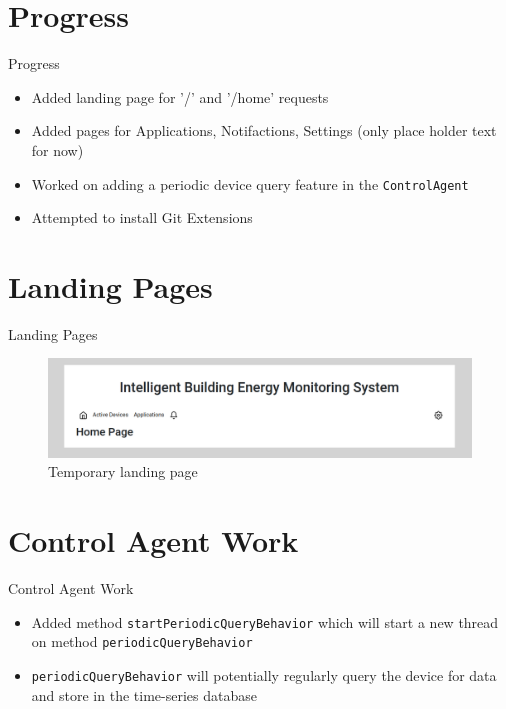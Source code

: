 \documentclass{beamer}
\begin{document}
\section{Progress}
\begin{frame}{Progress}{}
	\begin{itemize}
		\item Added landing page for '/' and '/home' requests
		\item Added pages for Applications, Notifactions, Settings (only place holder text for now)
		\item Worked on adding a periodic device query feature in the \texttt{ControlAgent}
		\item Attempted to install Git Extensions
	\end{itemize}
\end{frame}

\section{Landing Pages}
\begin{frame}{Landing Pages}{}
\begin{figure}
\centering
\includegraphics[scale=0.25]{../figs/img/landingPage}
\caption{Temporary landing page}
\end{figure}
\end{frame}

\section{Control Agent Work}
\begin{frame}{Control Agent Work}{}
\begin{itemize}
\item Added method \texttt{startPeriodicQueryBehavior} which will start a new thread on method \texttt{periodicQueryBehavior}
\item \texttt{periodicQueryBehavior} will potentially regularly query the device for data and store in the time-series database
\end{itemize}
\end{frame}
\end{document}

